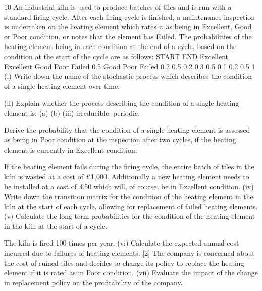 \documentclass[a4paper,12pt]{article}
\begin{document}
\begin{enumerate}
10
An industrial kiln is used to produce batches of tiles and is run with a standard firing cycle. After each firing cycle is finished, a maintenance inspection is undertaken on the heating element which rates it as being in Excellent, Good or Poor condition, or
notes that the element has Failed.
The probabilities of the heating element being in each condition at the end of a cycle,
based on the condition at the start of the cycle are as follows:
START
END
Excellent
Excellent
Good
Poor
Failed
0.5
Good Poor Failed
0.2
0.5 0.2
0.3
0.5 0.1
0.2
0.5
1
(i) Write down the name of the stochastic process which describes the condition of a single heating element over time.

(ii) Explain whether the process describing the condition of a single heating
element is:
(a)
(b)
(iii)
irreducible.
periodic.

Derive the probability that the condition of a single heating element is assessed as being in Poor condition at the inspection after two cycles, if the heating element is currently in Excellent condition.

If the heating element fails during the firing cycle, the entire batch of tiles in the kiln is wasted at a cost of £1,000. Additionally a new heating element needs to be installed at a cost of £50 which will, of course, be in Excellent condition.
(iv) Write down the transition matrix for the condition of the heating element in the kiln at the start of each cycle, allowing for replacement of failed heating elements.
(v) Calculate the long term probabilities for the condition of the heating element in the kiln at the start of a cycle.

The kiln is fired 100 times per year.
(vi)
Calculate the expected annual cost incurred due to failures of heating
elements.
[2]
The company is concerned about the cost of ruined tiles and decides to change its policy to replace the heating element if it is rated as in Poor condition.
(vii)
Evaluate the impact of the change in replacement policy on the profitability of
the company.



\end{enumerate}
\end{document}
